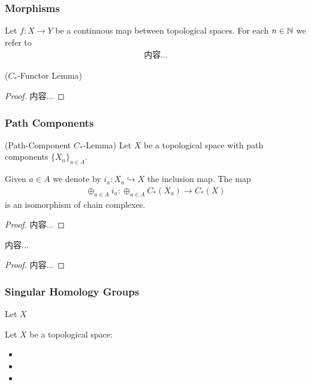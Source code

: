 \documentclass[Total.tex]{subfiles}
\begin{document}
			\subsubsection{Morphisms}
				\begin{Def}
					Let $f:X\rightarrow Y$ be a continuous map between topological spaces. For each $n\in \mathbb{N}$ we refer to
					\begin{gather*}
						内容...
					\end{gather*}
				\end{Def}
				\begin{lemma}
					($C_*$-Functor Lemma)
				\end{lemma}
				\begin{proof}
					内容...
				\end{proof}
			
			\subsubsection{Path Components}
				\begin{lemma}
					(Path-Component $C_*$-Lemma) Let $X$ be a topological space with path components $\{X_a\}_{a\in A}$. 
					
					Given $a\in A$ we denote by $i_a:X_a\hookrightarrow X$ the inclusion map. The map
					\begin{gather*}
						\oplus_{a\in A} i_a:\oplus_{a\in A} C_*(X_a)\rightarrow C_*(X)
					\end{gather*}
					is an isomorphism of chain complexes.
				\end{lemma}
				\begin{proof}
					内容...
				\end{proof}
				\begin{lemma}
					内容...
				\end{lemma}
				\begin{proof}
					内容...
				\end{proof}
			\subsubsection{Singular Homology Groups}
				\begin{Def}
					Let $X$ 
				\end{Def}
				
				\begin{Def}
					Let $X$ be a topological space:
					\begin{itemize}
						\item 
						\item 
						\item 
					\end{itemize}
				\end{Def}
\end{document}
